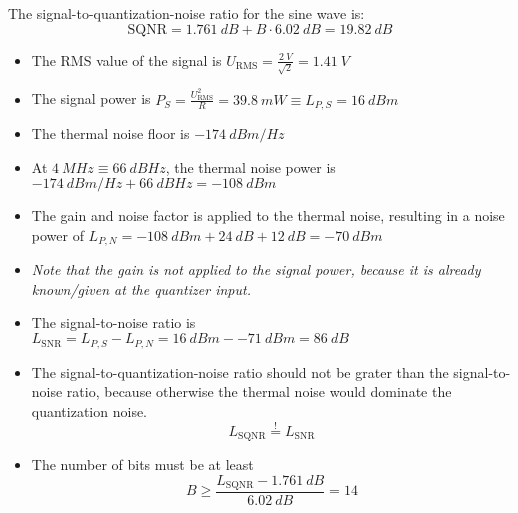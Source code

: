 \begin{solution}
\begin{tasks}
		The signal-to-quantization-noise ratio for the sine wave is:
		\begin{equation*}
			\mathrm{SQNR} = \SI{1.761}{dB} + B \cdot \SI{6.02}{dB} = \SI{19.82}{dB}
		\end{equation*}
		
		\task
		\begin{itemize}
			\item The RMS value of the signal is $U_{\mathrm{RMS}} = \frac{\SI{2}{V}}{\sqrt{2}} = \SI{1.41}{V}$
			\item The signal power is $P_S = \frac{U_{\mathrm{RMS}}^2}{R} = \SI{39.8}{mW} \equiv L_{P,S} = \SI{16}{dBm}$
			\item The thermal noise floor is $\SI{-174}{dBm/Hz}$
			\item At $\SI{4}{MHz} \equiv \SI{66}{dBHz}$, the thermal noise power is $\SI{-174}{dBm/Hz} + \SI{66}{dBHz} = \SI{-108}{dBm}$
			\item The gain and noise factor is applied to the thermal noise, resulting in a noise power of $L_{P,N} = \SI{-108}{dBm} + \SI{24}{dB} + \SI{12}{dB} = \SI{-70}{dBm}$
			\item \textit{Note that the gain is not applied to the signal power, because it is already known/given at the quantizer input.}
			\item The signal-to-noise ratio is $L_{\mathrm{SNR}} = L_{P,S} - L_{P,N} = \SI{16}{dBm} - \SI{-71}{dBm} = \SI{86}{dB}$
			\item The signal-to-quantization-noise ratio should not be grater than the signal-to-noise ratio, because otherwise the thermal noise would dominate the quantization noise.
			\begin{equation*}
				L_{\mathrm{SQNR}} \stackrel{!}{=} L_{\mathrm{SNR}}
			\end{equation*}
			\item The number of bits must be at least
			\begin{equation*}
				B \geq \frac{L_{\mathrm{SQNR}} - \SI{1.761}{dB}}{\SI{6.02}{dB}} = 14
			\end{equation*}
		\end{itemize}
	\end{tasks}
\end{solution}

%
